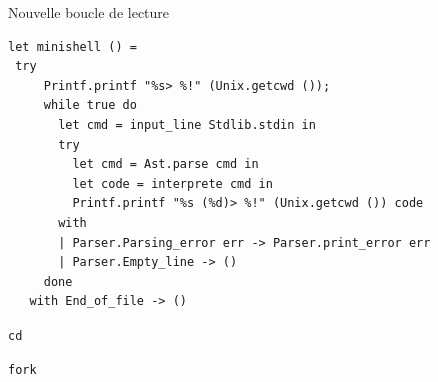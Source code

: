 \begin{frame}[fragile]{Nouvelle boucle de lecture}
\begin{lstlisting}
let minishell () =
 try
     Printf.printf "%s> %!" (Unix.getcwd ());
     while true do
       let cmd = input_line Stdlib.stdin in
       try 
         let cmd = Ast.parse cmd in
         let code = interprete cmd in
         Printf.printf "%s (%d)> %!" (Unix.getcwd ()) code
       with
       | Parser.Parsing_error err -> Parser.print_error err
       | Parser.Empty_line -> ()
     done
   with End_of_file -> ()
\end{lstlisting}
\end{frame}

\begin{frame}{\texttt{cd}}
    
\end{frame}

\begin{frame}{\texttt{fork}}

\end{frame}
